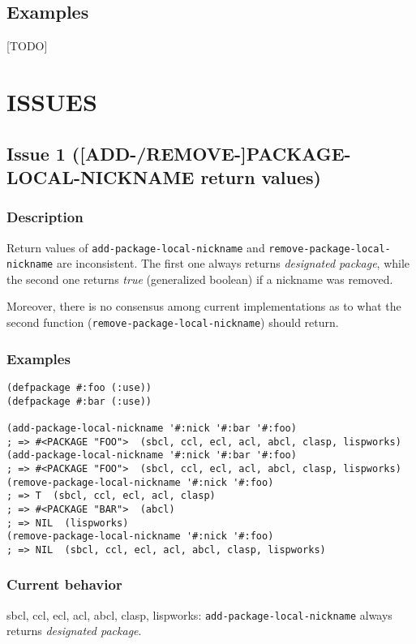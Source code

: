 \documentclass[11pt]{article}
\begin{document}
\subsection{Examples}
\label{sec:org5a180d1}
[TODO]
\section{ISSUES}
\label{sec:orgb1f9d8a}

\subsection{Issue 1 ([ADD-/REMOVE-]PACKAGE-LOCAL-NICKNAME return values)}
\label{sec:orgb9483d0}
\subsubsection{Description}
\label{sec:orgf07e86e}
Return values of \texttt{add-package-local-nickname} and \texttt{remove-package-local-nickname}
are inconsistent. The first one always returns \emph{designated package}, while the
second one returns \emph{true} (generalized boolean) if a nickname was removed.

Moreover, there is no consensus among current implementations as to what the second
function (\texttt{remove-package-local-nickname}) should return.
\subsubsection{Examples}
\label{sec:org1b2dbef}
\begin{verbatim}
(defpackage #:foo (:use))
(defpackage #:bar (:use))

(add-package-local-nickname '#:nick '#:bar '#:foo)
; => #<PACKAGE "FOO">  (sbcl, ccl, ecl, acl, abcl, clasp, lispworks)
(add-package-local-nickname '#:nick '#:bar '#:foo)
; => #<PACKAGE "FOO">  (sbcl, ccl, ecl, acl, abcl, clasp, lispworks)
(remove-package-local-nickname '#:nick '#:foo)
; => T  (sbcl, ccl, ecl, acl, clasp)
; => #<PACKAGE "BAR">  (abcl)
; => NIL  (lispworks)
(remove-package-local-nickname '#:nick '#:foo)
; => NIL  (sbcl, ccl, ecl, acl, abcl, clasp, lispworks)
\end{verbatim}
\subsubsection{Current behavior}
\label{sec:orgcb56b6e}
sbcl, ccl, ecl, acl, abcl, clasp, lispworks:
  \texttt{add-package-local-nickname} always returns \emph{designated package}.
\end{document}
